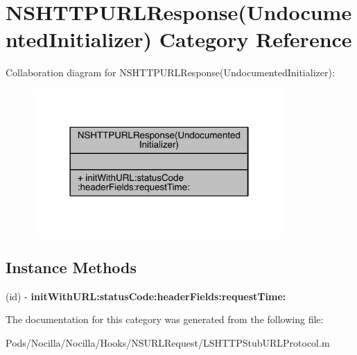 \hypertarget{category_n_s_h_t_t_p_u_r_l_response_07_undocumented_initializer_08}{\section{N\-S\-H\-T\-T\-P\-U\-R\-L\-Response(Undocumented\-Initializer) Category Reference}
\label{category_n_s_h_t_t_p_u_r_l_response_07_undocumented_initializer_08}
}


Collaboration diagram for N\-S\-H\-T\-T\-P\-U\-R\-L\-Response(Undocumented\-Initializer)\-:\nopagebreak
\begin{figure}[H]
\begin{center}
\leavevmode
\includegraphics[width=272pt]{category_n_s_h_t_t_p_u_r_l_response_07_undocumented_initializer_08__coll__graph}
\end{center}
\end{figure}
\subsection*{Instance Methods}
\begin{DoxyCompactItemize}
\item 
\hypertarget{category_n_s_h_t_t_p_u_r_l_response_07_undocumented_initializer_08_a0cdedb8033883f196fde2be88f4eee47}{(id) -\/ {\bfseries init\-With\-U\-R\-L\-:status\-Code\-:header\-Fields\-:request\-Time\-:}}\label{category_n_s_h_t_t_p_u_r_l_response_07_undocumented_initializer_08_a0cdedb8033883f196fde2be88f4eee47}

\end{DoxyCompactItemize}


The documentation for this category was generated from the following file\-:\begin{DoxyCompactItemize}
\item 
Pods/\-Nocilla/\-Nocilla/\-Hooks/\-N\-S\-U\-R\-L\-Request/L\-S\-H\-T\-T\-P\-Stub\-U\-R\-L\-Protocol.\-m\end{DoxyCompactItemize}
